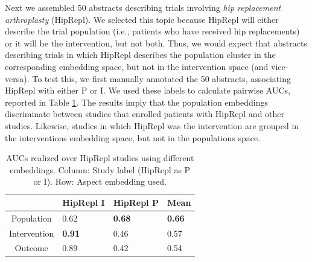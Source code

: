\documentclass[11pt,a4paper]{article}
\begin{document}
Next we assembled 50 abstracts describing trials involving \emph{hip replacement arthroplasty} (HipRepl). We selected this topic because HipRepl will either describe the trial population (i.e., patients who have received hip replacements) or it will be the intervention, but not both. Thus, we would expect that abstracts describing trials in which HipRepl describes the population cluster in the corresponding embedding space, but not in the intervention space (and vice-versa). To test this, we first manually annotated the 50 abstracts, associating HipRepl with either P or I. We used these labels to calculate pairwise AUCs, reported in Table \ref{table:pubmed-AUCS}. The results imply that the population embeddings discriminate between studies that enrolled patients with HipRepl and other studies. Likewise, studies in which HipRepl was the intervention are grouped in the interventions embedding space, but not in the populations space. 

\begin{table}
\small
\begin{tabularx}{\columnwidth}{c|X X X}
& HipRepl I & HipRepl P & Mean \\ \hline
Population & 0.62 & \textbf{0.68} & \textbf{0.66} \\ 
Intervention & \textbf{0.91} & 0.46 & 0.57 \\ 
Outcome & 0.89 & 0.42 & 0.54 \\ 
\end{tabularx}
\vspace{-.65em}
\caption{AUCs realized over HipRepl studies using different embeddings. Column: Study label (HipRepl as P or I). Row: Aspect embedding used.}
\label{table:pubmed-AUCS}
\vspace{-.75em}
\end{table}
\end{document}
